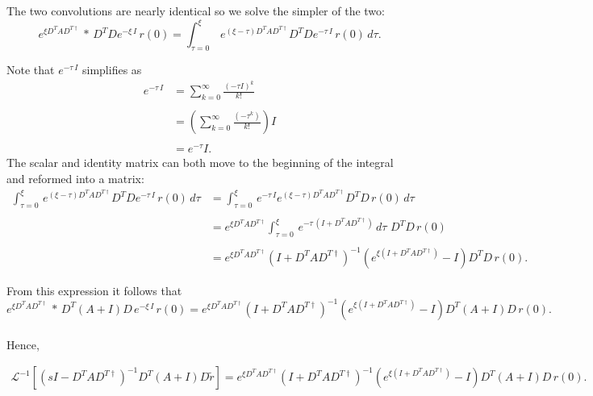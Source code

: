 \begin{enumerate}
The two convolutions are nearly identical so we solve the simpler of the two:
\\
$$
	e^{\xi D^T A D^{T \dagger}}
	\, 	*  \,
	D^T D e^{-\xi \, I} \, r(0)
	= 
	\int_{\tau=0}^{\xi} \,
		e^{ \left(\xi-\tau\right) D^T A D^{T \dagger}}
		D^T D e^{-\tau \, I} \, r(0)
		\, d\tau.
$$

Note that $e^{-\tau \, I}$ simplifies as 
\begin{align*}
e^{-\tau \, I}
&=
\sum_{k=0}^{\infty}
\frac{\left(-\tau I\right)^{k}}{k!}
%
\\
\\
%
&=
\left(
	\sum_{k=0}^{\infty}
	\frac{(-\tau^{k})}{k!}
\right) I
%
\\
\\
%
&= e^{-\tau} I.
\end{align*}
The scalar and identity matrix can both move to the beginning of the integral and reformed into a matrix:
\begin{align*}
	\int_{\tau=0}^{\xi} \,
		e^{ \left(\xi-\tau\right) D^T A D^{T \dagger}}
		D^T D e^{-\tau \, I} \, r(0)
	\, d\tau
	&= 
	\int_{\tau=0}^{\xi} \,
		e^{-\tau \, I}
		e^{ \left(\xi-\tau\right) D^T A D^{T \dagger}}
		D^T D \, r(0)
	\, d\tau
	\\
	\\
	&=
	e^{\xi D^T A D^{T \dagger}}
	\int_{\tau=0}^{\xi} \,
		e^
		{
			-\tau \, \left( I + D^T A D^{T \dagger} \right)
		}
	\, d\tau
	\, \,
	D^T D \, r(0)
	\\
	\\
	&=
	e^{\xi D^T A D^{T \dagger}}
	\left( I + D^T A D^{T \dagger} \right)^{-1}
	\left(
		e^{\xi \left( I + D^T A D^{T \dagger} \right)} - I
	\right)
	D^T D \, r(0).
\end{align*}

From this expression it follows that 
\\
$$
	e^{\xi D^T A D^{T \dagger}}
	\, 
	*	
	\,
		D^T 
		\left(
			A + I
		\right)	
		D \, 
		e^{-\xi \, I} \, r(0)
	=
		e^{\xi D^T A D^{T \dagger}}
	\left( I + D^T A D^{T \dagger} \right)^{-1}
	\left(
		e^{\xi \left( I + D^T A D^{T \dagger} \right)} - I
	\right)
	D^T(A + I)D \, r(0).	
$$
\\
Hence, 

\begin{align}
\label{eq:analysis:comparison_sc_vs_pcf_vs_gj:gj_voltage_intermittent_laplace_transformed_term_1}
\mathcal{L}^{-1}
	\left[
		\left(
			sI - D^T A D^{T \dagger}
		\right)^{-1}
		D^T 
		\left(
			A + I
		\right)	
		D \tilde{r}
	\right]
	=
	e^{\xi D^T A D^{T \dagger}}
	\left( I + D^T A D^{T \dagger} \right)^{-1}
	\left(
		e^{\xi \left( I + D^T A D^{T \dagger} \right)} - I
	\right)
	D^T(A + I)D \, r(0).	
\end{align}


\end{enumerate}
